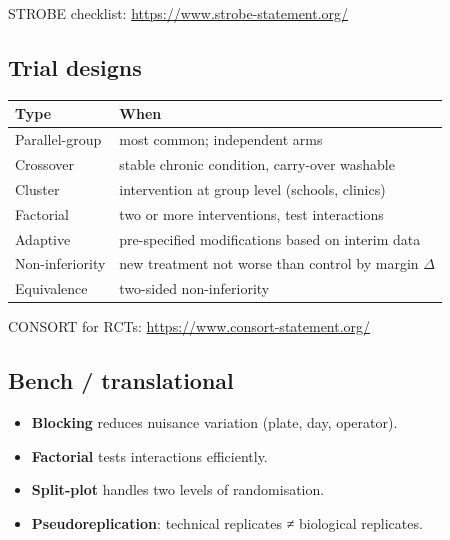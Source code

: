 \documentclass[
]{article}
\newcounter{none} %
\providecommand{\tightlist}{%
  \setlength{\itemsep}{0pt}\setlength{\parskip}{0pt}}
\begin{document}
STROBE checklist: \url{https://www.strobe-statement.org/}

\subsection{Trial designs}\label{trial-designs}

{\def\LTcaptype{none} %
\begin{longtable}[]{@{}
  >{\raggedright\arraybackslash}p{}
  >{\raggedright\arraybackslash}p{}@{}}
\toprule\noalign{}
\begin{minipage}[b]{\linewidth}\raggedright
Type
\end{minipage} & \begin{minipage}[b]{\linewidth}\raggedright
When
\end{minipage} \\
\midrule\noalign{}
\endhead
\bottomrule\noalign{}
\endlastfoot
Parallel-group & most common; independent arms \\
Crossover & stable chronic condition, carry-over washable \\
Cluster & intervention at group level (schools, clinics) \\
Factorial & two or more interventions, test interactions \\
Adaptive & pre-specified modifications based on interim data \\
Non-inferiority & new treatment not worse than control by margin
\(\Delta\) \\
Equivalence & two-sided non-inferiority \\
\end{longtable}
}

CONSORT for RCTs: \url{https://www.consort-statement.org/}

\subsection{Bench / translational}\label{bench-translational}

\begin{itemize}
\tightlist
\item
  \textbf{Blocking} reduces nuisance variation (plate, day, operator).
\item
  \textbf{Factorial} tests interactions efficiently.
\item
  \textbf{Split-plot} handles two levels of randomisation.
\item
  \textbf{Pseudoreplication}: technical replicates ≠ biological
  replicates.
\end{itemize}
\end{document}
